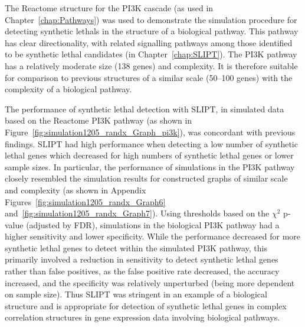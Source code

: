 The Reactome  structure for the PI3K cascade (as used in Chapter~\ref{chap:Pathways}) was used to demonstrate the simulation procedure for detecting \glspl{synthetic lethal} in the  structure of a biological pathway. This pathway has clear directionality, with related signalling pathways among those identified to be \gls{synthetic lethal} candidates (in Chapter~\ref{chap:SLIPT}). The PI3K pathway has a relatively moderate size (138 genes) and complexity. It is therefore suitable for comparison to previous  structures of a similar scale (50--100 genes) with the complexity of a biological pathway.

The performance of \gls{synthetic lethal} detection with \gls{SLIPT}, in simulated  data based on the Reactome PI3K pathway (as shown in Figure~\ref{fig:simulation1205_randx_Graph_pi3k}), was concordant with previous findings. \gls{SLIPT} had high performance when detecting a low number of \gls{synthetic lethal} genes which decreased for high numbers of \gls{synthetic lethal} genes or lower sample sizes. In particular, the performance of simulations in the PI3K pathway closely resembled the simulation results for constructed \glspl{graph} of similar scale and complexity (as shown in Appendix Figures~\ref{fig:simulation1205_randx_Graph6} and~\ref{fig:simulation1205_randx_Graph7}). Using thresholds based on the $\chi^2$ p-value (adjusted by \gls{FDR}), simulations in the biological PI3K pathway had a higher sensitivity and lower specificity. While the performance decreased for more \gls{synthetic lethal} genes to detect within the simulated PI3K pathway, this primarily involved a reduction in sensitivity to detect \gls{synthetic lethal} genes rather than false positives, as the false positive rate decreased, the accuracy increased, and the specificity was relatively unperturbed (being more dependent on sample size). Thus \gls{SLIPT} was stringent in an example of a biological  structure and is appropriate for detection of \gls{synthetic lethal} genes in complex correlation structures in \gls{gene expression} data involving biological pathways. 

